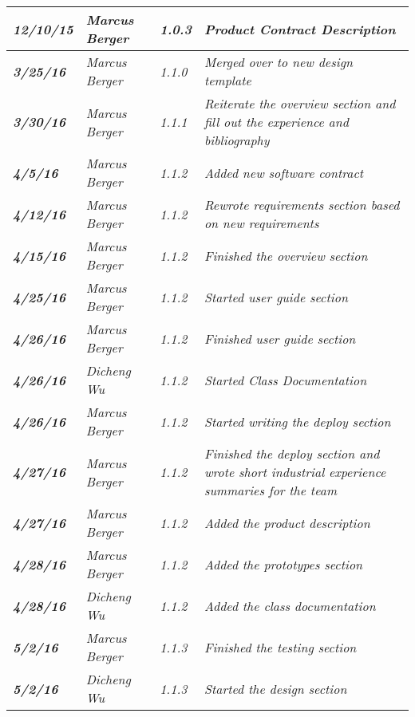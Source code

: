 \begin{tabular}{|>{\raggedright}p{1.5cm}|>{\raggedright}p{3cm}|>{\raggedright}p{1.5cm}|>{\raggedright}p{9cm}|}
\hline
\textit{\textbf{12/10/15}} & \textit{Marcus Berger} & \textit{1.0.3} & \textit{Product Contract Description}\tabularnewline
\hline
\textit{\textbf{3/25/16}} & \textit{Marcus Berger} & \textit{1.1.0} & \textit{Merged over to new design template}\tabularnewline
\hline
\textit{\textbf{3/30/16}} & \textit{Marcus Berger} & \textit{1.1.1} & \textit{Reiterate the overview section and fill out the experience and bibliography}\tabularnewline
\hline
\textit{\textbf{4/5/16}} & \textit{Marcus Berger} & \textit{1.1.2} & \textit{Added new software contract}\tabularnewline
\hline
\textit{\textbf{4/12/16}} & \textit{Marcus Berger} & \textit{1.1.2} & \textit{Rewrote requirements section based on new requirements }\tabularnewline
\hline
\textit{\textbf{4/15/16}} & \textit{Marcus Berger} & \textit{1.1.2} & \textit{Finished the overview section}\tabularnewline
\hline
\textit{\textbf{4/25/16}} & \textit{Marcus Berger} & \textit{1.1.2} & \textit{Started user guide section}\tabularnewline
\hline
\textit{\textbf{4/26/16}} & \textit{Marcus Berger} & \textit{1.1.2} & \textit{Finished user guide section}\tabularnewline
\hline
\textit{\textbf{4/26/16}} & \textit{Dicheng Wu} & \textit{1.1.2} & \textit{Started Class Documentation}\tabularnewline
\hline
\textit{\textbf{4/26/16}} & \textit{Marcus Berger} & \textit{1.1.2} & \textit{Started writing the deploy section}\tabularnewline
\hline
\textit{\textbf{4/27/16}} & \textit{Marcus Berger} & \textit{1.1.2} & \textit{Finished the deploy section and wrote short industrial experience summaries for the team}\tabularnewline
\hline
\textit{\textbf{4/27/16}} & \textit{Marcus Berger} & \textit{1.1.2} & \textit{Added the product description}\tabularnewline
\hline
\textit{\textbf{4/28/16}} & \textit{Marcus Berger} & \textit{1.1.2} & \textit{Added the prototypes section}\tabularnewline
\hline
\textit{\textbf{4/28/16}} & \textit{Dicheng Wu} & \textit{1.1.2} & \textit{Added the class documentation}\tabularnewline
\hline
\hline
\textit{\textbf{5/2/16}} & \textit{Marcus Berger} & \textit{1.1.3} & \textit{Finished the testing section}\tabularnewline
\hline
\textit{\textbf{5/2/16}} & \textit{Dicheng Wu} & \textit{1.1.3} & \textit{Started the design section}\tabularnewline
\hline
\end{tabular}
\vfill

